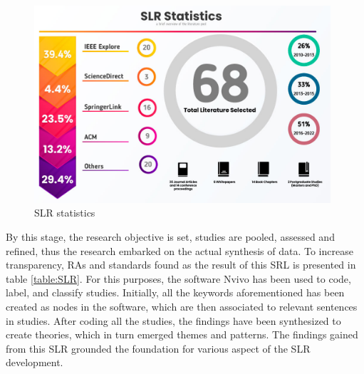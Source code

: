 \documentclass[review]{elsarticle}
\begin{document}
\begin{figure}[h!]
    \centering
    \includegraphics[width=11cm]{databases-statitistic.jpg}
    \caption{SLR statistics}
    \label{fig:SLRStats}
\end{figure}


By this stage, the research objective is set, studies are pooled, assessed and refined, thus the research embarked on the actual synthesis of data. To increase transparency, RAs and standards found as the result of this SRL is presented in table \ref{table:SLR}. For this purposes, the software Nvivo \cite{nvivo} has been used to code, label, and classify studies. Initially, all the keywords aforementioned has been created as nodes in the software, which are then associated to relevant sentences in studies. After coding all the studies, the findings have been synthesized to create theories, which in turn emerged themes and patterns. The findings gained from this SLR grounded the foundation for various aspect of the SLR development.
\end{document}
